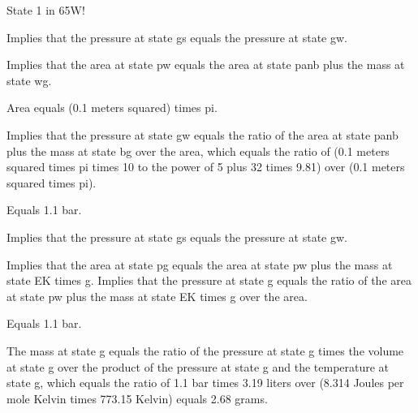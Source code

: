 State 1 in 65W!

Implies that the pressure at state gs equals the pressure at state gw.

Implies that the area at state pw equals the area at state panb plus the mass at state wg.

Area equals (0.1 meters squared) times pi.

Implies that the pressure at state gw equals the ratio of the area at state panb plus the mass at state bg over the area, which equals the ratio of (0.1 meters squared times pi times 10 to the power of 5 plus 32 times 9.81) over (0.1 meters squared times pi).

Equals 1.1 bar.

Implies that the pressure at state gs equals the pressure at state gw.

Implies that the area at state pg equals the area at state pw plus the mass at state EK times g. Implies that the pressure at state g equals the ratio of the area at state pw plus the mass at state EK times g over the area.

Equals 1.1 bar.

The mass at state g equals the ratio of the pressure at state g times the volume at state g over the product of the pressure at state g and the temperature at state g, which equals the ratio of 1.1 bar times 3.19 liters over (8.314 Joules per mole Kelvin times 773.15 Kelvin) equals 2.68 grams.
